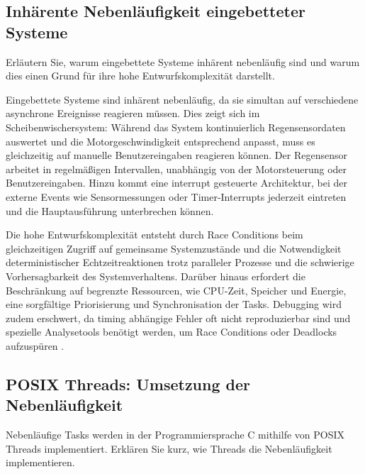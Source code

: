 \documentclass[
%
ngerman %
%
numeric %
]{wbh-assignment}
\begin{document}
\subsection{Inhärente Nebenläufigkeit eingebetteter Systeme}
\begin{aufgabenstellung}
Erläutern Sie, warum eingebettete Systeme inhärent nebenläufig sind und warum dies einen Grund für ihre hohe Entwurfskomplexität darstellt.
\end{aufgabenstellung}

\vspace*{5mm}

Eingebettete Systeme sind inhärent nebenläufig, da sie simultan auf verschiedene asynchrone Ereignisse reagieren müssen.
Dies zeigt sich im Scheibenwischersystem: Während das System kontinuierlich Regensensordaten auswertet und die Motorgeschwindigkeit entsprechend anpasst, muss es gleichzeitig auf manuelle Benutzereingaben reagieren können.
Der Regensensor arbeitet in regelmäßigen Intervallen, unabhängig von der Motorsteuerung oder Benutzereingaben.
Hinzu kommt eine interrupt gesteuerte Architektur, bei der externe Events wie Sensormessungen oder Timer-Interrupts jederzeit eintreten und die Hauptausführung unterbrechen können.

Die hohe Entwurfskomplexität entsteht durch Race Conditions beim gleichzeitigen Zugriff auf gemeinsame Systemzustände und die Notwendigkeit deterministischer Echtzeitreaktionen trotz paralleler Prozesse und die schwierige Vorhersagbarkeit des Systemverhaltens.
Darüber hinaus erfordert die Beschränkung auf begrenzte Ressourcen, wie CPU-Zeit, Speicher und Energie, eine sorgfältige Priorisierung und Synchronisation der Tasks.
Debugging wird zudem erschwert, da timing abhängige Fehler oft nicht reproduzierbar sind und spezielle Analysetools benötigt werden, um Race Conditions oder Deadlocks aufzuspüren \cite{cummingsManagingConcurrencyComplex, ConcurrencyInterruptsMicrocontrollers}.

\newpage

\subsection{POSIX Threads: Umsetzung der Nebenläufigkeit}
\begin{aufgabenstellung}
Nebenläufige Tasks werden in der Programmiersprache C mithilfe von POSIX Threads implementiert. Erklären Sie kurz, wie Threads die Nebenläufigkeit implementieren.
\end{aufgabenstellung}
\end{document}
